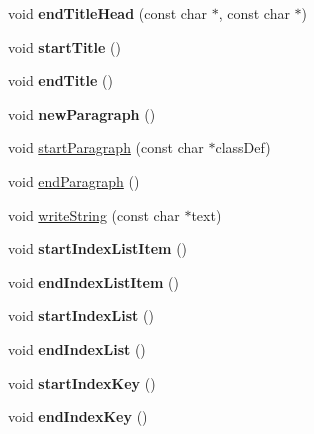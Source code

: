 \begin{DoxyCompactItemize}
void {\bfseries end\+Title\+Head} (const char $\ast$, const char $\ast$)
\item 
\mbox{\label{class_man_generator_ae53c0d4f7905f85069f2e253f97f99a6}} 
void {\bfseries start\+Title} ()
\item 
\mbox{\label{class_man_generator_a5f10174e0eec5ab53365aad27ad48f22}} 
void {\bfseries end\+Title} ()
\item 
\mbox{\label{class_man_generator_a0242c97cf62889e69e74196b9567e7d0}} 
void {\bfseries new\+Paragraph} ()
\item 
void \mbox{\hyperlink{class_man_generator_a311b0dd8edecddbfa0473c5e43a97e73}{start\+Paragraph}} (const char $\ast$class\+Def)
\item 
void \mbox{\hyperlink{class_man_generator_a7c4c2315a23018eb35413776b36b29e7}{end\+Paragraph}} ()
\item 
void \mbox{\hyperlink{class_man_generator_a39ca2f1de2bbbe5548f6f03997a84c88}{write\+String}} (const char $\ast$text)
\item 
\mbox{\label{class_man_generator_ab4387706fb5b4d1d0f1bfdab7a077ce1}} 
void {\bfseries start\+Index\+List\+Item} ()
\item 
\mbox{\label{class_man_generator_ae568d65474b86966690b7d9770f30f0d}} 
void {\bfseries end\+Index\+List\+Item} ()
\item 
\mbox{\label{class_man_generator_a9c1a9e6d28d35c61d8bada0b3df54135}} 
void {\bfseries start\+Index\+List} ()
\item 
\mbox{\label{class_man_generator_a34fbcb10cccc244f8233e2c0bc3584be}} 
void {\bfseries end\+Index\+List} ()
\item 
\mbox{\label{class_man_generator_abe1776365631974d6789cb6fceef5d62}} 
void {\bfseries start\+Index\+Key} ()
\item 
\mbox{\label{class_man_generator_ae60fe67ecdfd731f94c129a767e2a296}} 
void {\bfseries end\+Index\+Key} ()
\item 
\mbox{\label{class_man_generator_ab554eb3dc18eceac143faf9ca3d29859}} 

\end{DoxyCompactItemize}

